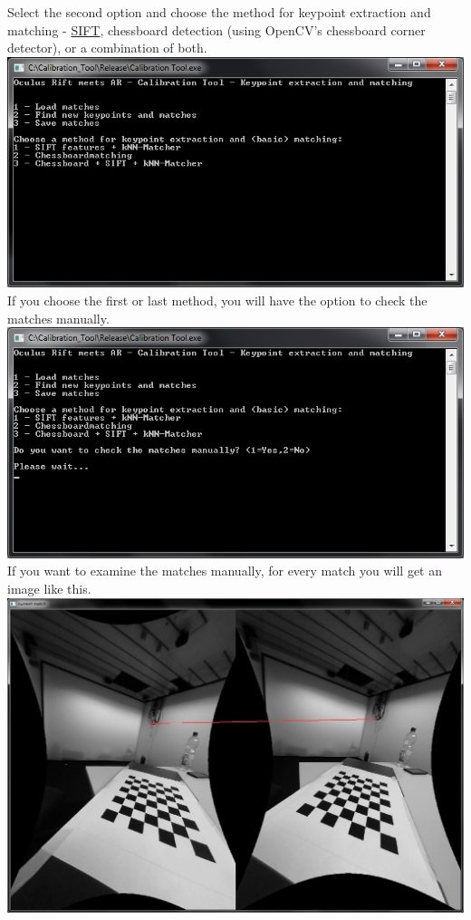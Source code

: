 \documentclass[]{article}
\begin{document}
\begin{enumerate}
  Select the second option and choose the method for keypoint extraction
  and matching -
  \href{http://en.wikipedia.org/wiki/Scale-invariant_feature_transform}{SIFT},
  chessboard detection (using OpenCV's chessboard corner detector), or a
  combination of both.\\
  \includegraphics*{5.jpg}
  If you choose the first or last method, you will have the option to
  check the matches manually.\\
  \includegraphics*{6.jpg}
  If you want to examine the matches manually, for every match you will
  get an image like this.\\
  \includegraphics*{7.jpg}

\end{enumerate}
\end{document}
